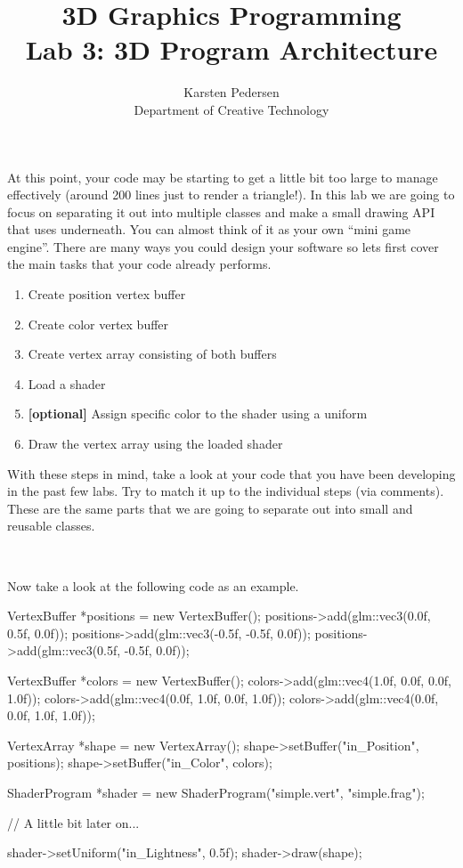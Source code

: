 \documentclass[10pt]{article}
\begin{document}
\title{3D Graphics Programming \\
  \large Lab 3: 3D Program Architecture}

\author{Karsten Pedersen\\ Department of Creative Technology}
\maketitle

At this point, your code may be starting to get a little bit too large
to manage effectively (around 200 lines just to render a triangle!). In
this lab we are going to focus on separating it out into multiple classes
and make a small drawing API that uses  underneath. You
can almost think of it as your own ``mini game engine''.  There are many
ways you could design your software so lets first cover the main tasks
that your code already performs.

\begin{enumerate}
  \item Create position vertex buffer
  \item Create color vertex buffer
  \item Create vertex array consisting of both buffers
  \item Load a shader
  \item \textbf{[optional]} Assign specific color to the shader using a uniform
  \item Draw the vertex array using the loaded shader
\end{enumerate}

With these steps in mind, take a look at your code that you have been
developing in the past few labs. Try to match it up to the individual
steps (via comments). These are the same parts that we are going to
separate out into small and reusable classes.

\

Now take a look at the following code as an example.

\begin{Code}
  VertexBuffer *positions = new VertexBuffer();
  positions->add(glm::vec3(0.0f, 0.5f, 0.0f));
  positions->add(glm::vec3(-0.5f, -0.5f, 0.0f));
  positions->add(glm::vec3(0.5f, -0.5f, 0.0f));

  VertexBuffer *colors = new VertexBuffer();
  colors->add(glm::vec4(1.0f, 0.0f, 0.0f, 1.0f));
  colors->add(glm::vec4(0.0f, 1.0f, 0.0f, 1.0f));
  colors->add(glm::vec4(0.0f, 0.0f, 1.0f, 1.0f));

  VertexArray *shape = new VertexArray();
  shape->setBuffer("in_Position", positions);
  shape->setBuffer("in_Color", colors);

  ShaderProgram *shader = new ShaderProgram("simple.vert", "simple.frag");

  // A little bit later on...

  shader->setUniform("in_Lightness", 0.5f);
  shader->draw(shape);
\end{Code}
\end{document}
